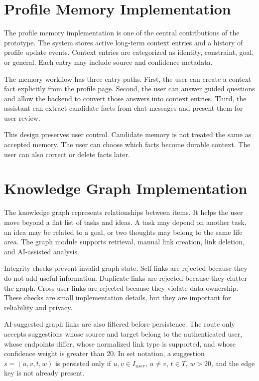 \section{Profile Memory Implementation}

The profile memory implementation is one of the central contributions of the prototype. The system stores active long-term context entries and a history of profile update events. Context entries are categorized as identity, constraint, goal, or general. Each entry may include source and confidence metadata.

The memory workflow has three entry paths. First, the user can create a context fact explicitly from the profile page. Second, the user can answer guided questions and allow the backend to convert those answers into context entries. Third, the assistant can extract candidate facts from chat messages and present them for user review.

This design preserves user control. Candidate memory is not treated the same as accepted memory. The user can choose which facts become durable context. The user can also correct or delete facts later.


\section{Knowledge Graph Implementation}

The knowledge graph represents relationships between items. It helps the user move beyond a flat list of tasks and ideas. A task may depend on another task, an idea may be related to a goal, or two thoughts may belong to the same life area. The graph module supports retrieval, manual link creation, link deletion, and AI-assisted analysis.

Integrity checks prevent invalid graph state. Self-links are rejected because they do not add useful information. Duplicate links are rejected because they clutter the graph. Cross-user links are rejected because they violate data ownership. These checks are small implementation details, but they are important for reliability and privacy.

AI-suggested graph links are also filtered before persistence. The route only accepts suggestions whose source and target belong to the authenticated user, whose endpoints differ, whose normalized link type is supported, and whose confidence weight is greater than 20. In set notation, a suggestion \(s=(u,v,t,w)\) is persisted only if \(u,v \in I_{user}\), \(u \ne v\), \(t \in T\), \(w > 20\), and the edge key is not already present.

